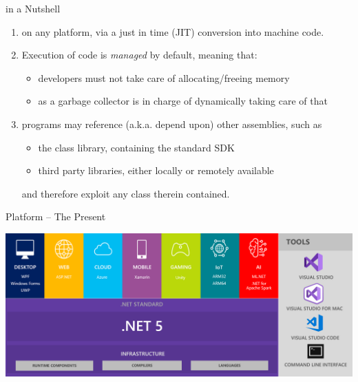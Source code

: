 \documentclass[presentation]{beamer}
\begin{document}
\begin{frame}[allowframebreaks]{\dotnet in a Nutshell}
\begin{enumerate}
        \smallskip

        \item  on any platform, via a \alert{just in time} (JIT) conversion into \alert{machine code}.
        
        \framebreak

        \item Execution of \dotnet code is \emph{managed} by default, meaning that:
        \begin{itemize}
            \item developers must not take care of allocating/freeing memory
            \item as a \alert{garbage collector} is in charge of dynamically taking care of that
        \end{itemize}

        \bigskip

        \item \dotnet programs may reference (a.k.a. depend upon) other assemblies, such as
        \begin{itemize}
            \item the \alert{\dotnet class library}, containing the standard SDK
            \item \alert{third party libraries}, either locally or remotely available
        \end{itemize}
        and therefore exploit any class therein contained.

    \end{enumerate}
\end{frame}

\begin{frame}{\dotnet Platform -- The Present}
    \begin{center}
        \includegraphics[width=\linewidth]{img/dotnet-overview-present.png}
    \end{center}
\end{frame}
\end{document}
